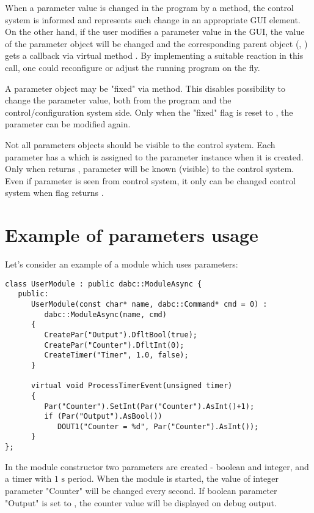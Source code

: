 When a parameter value is changed in the program by a  method, 
the control system is informed and represents such change in an appropriate GUI element.
On the other hand, if the user modifies a parameter value in the GUI, 
the value of the parameter object will be changed and the corresponding parent object 
(, ) gets a callback via 
virtual method . 
By implementing a suitable reaction in this call, 
one could reconfigure or adjust the running program on the fly.

A parameter object may be "fixed" via  method. 
This disables possibility to change the parameter value, both
from the program and the control/configuration system side. 
Only when the "fixed" flag is reset to ,
the parameter can be modified again.

Not all parameters objects should be visible to the control system. 
Each parameter has a  
which is assigned to the parameter instance when it is created.
Only when  returns , parameter will be  
known (visible) to the control system. Even if parameter is seen
from control system, it only can be changed  control system 
when flag  returns . 


\section{Example of parameters usage}
\label{prog_setup_parameterexample}
Let's consider an example of a module which uses parameters:

\begin{verbatim}
class UserModule : public dabc::ModuleAsync {
   public:
      UserModule(const char* name, dabc::Command* cmd = 0) : 
         dabc::ModuleAsync(name, cmd)
      {
         CreatePar("Output").DfltBool(true);
         CreatePar("Counter").DfltInt(0);
         CreateTimer("Timer", 1.0, false);
      }
      
      virtual void ProcessTimerEvent(unsigned timer)
      {
         Par("Counter").SetInt(Par("Counter").AsInt()+1);
         if (Par("Output").AsBool()) 
            DOUT1("Counter = %d", Par("Counter").AsInt());
      }
}; 
\end{verbatim}

In the module constructor two parameters are created - boolean and integer, 
and a timer with $1\mbox{~s}$ period.
When the module is started, the value of integer parameter "Counter" 
will be changed every second.
If boolean parameter "Output" is set to , 
the counter value will be displayed on debug output.

